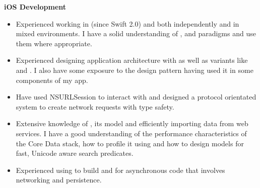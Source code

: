 \textbf{iOS Development}
\begin{itemize}
\item Experienced working in  (since Swift 2.0) and
   both independently and in mixed environments. I have a
  solid understanding of , 
  and  paradigms and use them where appropriate.
\item Experienced designing application architecture with  as well as
  variants like  and . I also have some exposure to
  the  design pattern having used it in some components of my app.
\item Have used NSURLSession to interact with  and
  designed a protocol orientated system to create network requests with type
  safety.
\item Extensive knowledge of , its  model
  and efficiently importing data from web services. I have a good understanding
  of the performance characteristics of the Core Data stack, how to profile it
  using  and how to design models for fast, Unicode aware
  search predicates.
\item Experienced using  to build  and
   for asynchronous code that involves networking and
  persistence.
\end{itemize}

